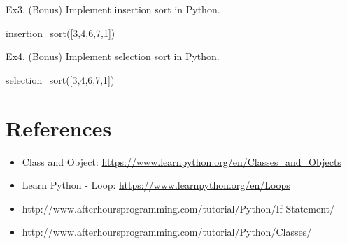 \documentclass[11pt]{article}
\providecommand{\tightlist}{%
      \setlength{\itemsep}{0pt}\setlength{\parskip}{0pt}}
\newenvironment{Shaded}{}{}
\newcommand{\DecValTok}[1]{\textcolor[rgb]{0.25,0.63,0.44}{{#1}}}
\newcommand{\NormalTok}[1]{{#1}}
\begin{document}
    Ex3. (Bonus) Implement insertion sort in Python.

\begin{Shaded}
\begin{Highlighting}[]
\NormalTok{insertion_sort([}\DecValTok{3}\NormalTok{,}\DecValTok{4}\NormalTok{,}\DecValTok{6}\NormalTok{,}\DecValTok{7}\NormalTok{,}\DecValTok{1}\NormalTok{])}
\end{Highlighting}
\end{Shaded}

    Ex4. (Bonus) Implement selection sort in Python.

\begin{Shaded}
\begin{Highlighting}[]
\NormalTok{selection_sort([}\DecValTok{3}\NormalTok{,}\DecValTok{4}\NormalTok{,}\DecValTok{6}\NormalTok{,}\DecValTok{7}\NormalTok{,}\DecValTok{1}\NormalTok{])}
\end{Highlighting}
\end{Shaded}

    \section{References}\label{references}

\begin{itemize}
\tightlist
\item
  Class and Object:
  \url{https://www.learnpython.org/en/Classes_and_Objects}
\item
  Learn Python - Loop: \url{https://www.learnpython.org/en/Loops}
\item
  http://www.afterhoursprogramming.com/tutorial/Python/If-Statement/
\item
  http://www.afterhoursprogramming.com/tutorial/Python/Classes/
\end{itemize}


    
    
    
    
\end{document}
